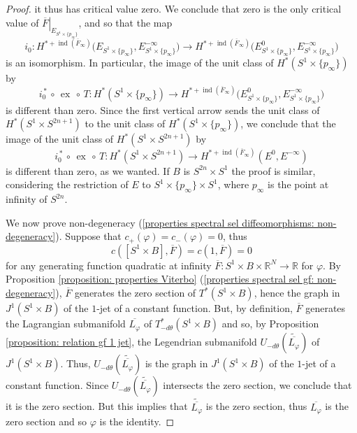\documentclass{amsart}
\DeclareMathOperator{\ex}{ex}
\DeclareMathOperator{\ind}{ind}
\theoremstyle{remark}
\begin{document}
\begin{proof}
it thus has critical value zero.
We conclude that zero is the only critical value
of $\left. \overline{F} \right\lvert_{E_{S^1 \times \{p_{\infty}\}}}$,
and so that the map
\[
i_0: H^{\ast + \ind (\overline{F}_{\infty})}
\big(E_{S^1 \times \{p_{\infty}\}}, E_{S^1 \times \{p_{\infty}\}}^{-\infty}\big)
\rightarrow H^{\ast + \ind (\overline{F}_{\infty})}
\big(E_{S^1 \times \{p_{\infty}\}}^0, E_{S^1 \times \{p_{\infty}\}}^{-\infty}\big)
\]
is an isomorphism.
In particular,
the image of the unit class of $H^{\ast} (S^1 \times \{p_{\infty}\})$
by
\[
i_0^{\,\ast} \,\circ\, \ex \,\circ\, T:
H^{\ast} (S^1 \times \{p_{\infty}\})
\rightarrow H^{\ast + \ind (\overline{F}_{\infty})}
\big(E_{S^1 \times \{p_{\infty}\}}^0, E_{S^1 \times \{p_{\infty}\}}^{-\infty}\big)
\]
is different than zero.
Since the first vertical arrow
sends the unit class of $H^{\ast} (S^1 \times S^{2n+1})$
to the unit class of $H^{\ast} (S^1 \times \{p_{\infty}\})$,
we conclude that the image
of the unit class of $H^{\ast} (S^1 \times S^{2n+1})$ by
\[
i_0^{\,\ast} \,\circ\, \ex \,\circ\, T:
H^{\ast} (S^1 \times S^{2n+1})
\rightarrow H^{\ast + \ind (\overline{F}_{\infty})}
(E^0, E^{-\infty})
\]
is different than zero,
as we wanted.
If $B$ is $S^{2n} \times S^1$
the proof is similar,
considering the restriction of $E$
to $S^1 \times \{p_{\infty}\} \times S^1$,
where $p_{\infty}$ is the point at infinity of $S^{2n}$.

We now prove non-degeneracy
(\ref{properties spectral sel diffeomorphisms: non-degeneracy}).
Suppose that $c_+ (\varphi) = c_- (\varphi) = 0$,
thus
\[
c ([S^1 \times B], \overline{F}) = c (1, \overline{F}) = 0
\]
for any generating function quadratic at infinity
$\overline{F}: S^1 \times B \times \mathbb{R}^N \rightarrow \mathbb{R}$
for $\varphi$.
By Proposition \ref{proposition: properties Viterbo}
(\ref{properties spectral sel gf: non-degeneracy}),
$\overline{F}$ generates the zero section of $T^{\ast} (S^1 \times B)$,
hence the graph in $J^1 (S^1 \times B)$
of the $1$-jet of a constant function.
But, by definition,
$\overline{F}$ generates the Lagrangian submanifold $\overline{L_{\varphi}}$
of $T^{\ast}_{-d\theta} (S^1 \times B)$
and so, by Proposition \ref{proposition: relation gf 1 jet},
the Legendrian submanifold $U_{-d\theta} (\widetilde{\overline{L_{\varphi}}})$
of $J^1 (S^1 \times B)$.
Thus,
$U_{-d\theta} (\widetilde{\overline{L_{\varphi}}})$
is the graph in $J^1 (S^1 \times B)$
of the $1$-jet of a constant function.
Since $U_{-d\theta} (\widetilde{\overline{L_{\varphi}}})$
intersects the zero section,
we conclude that it is the zero section.
But this implies that $\widetilde{\overline{L_{\varphi}}}$ is the zero section,
thus $\overline{L_{\varphi}}$ is the zero section
and so $\varphi$ is the identity.


\end{proof}
\end{document}
